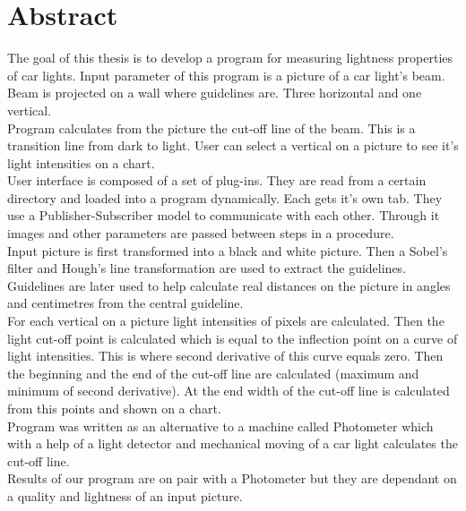 \documentclass[oneside, a4paper, 12pt]{book}
\newcommand{\clearemptydoublepage}{\newpage{\pagestyle{empty}\cleardoublepage}}
\begin{document}
\chapter*{Abstract}

The goal of this thesis is to develop a program for measuring lightness properties of car lights. Input parameter of this program is a picture of a car light's beam. Beam is projected on a wall where guidelines are. Three horizontal and one vertical. \\
Program calculates from the picture the cut-off line of the beam. This is a transition line from dark to light. User can select a vertical on a picture to see it's light intensities on a chart.\\
User interface is composed of a set of plug-ins. They are read from a certain directory and loaded into a program dynamically. Each gets it's own tab. They use a Publisher-Subscriber model to communicate with each other. Through it images and other parameters are passed between steps in a procedure.\\
Input picture is first transformed into a black and white picture. Then a Sobel's filter and Hough's line transformation are used to extract the guidelines. Guidelines are later used to help calculate real distances on the picture in angles and centimetres from the central guideline. \\
For each vertical on a picture light intensities of pixels are calculated. Then the light cut-off point is calculated which is equal to the inflection point on a curve of light intensities. This is where second derivative of this curve equals zero. Then the beginning and the end of the cut-off line are calculated (maximum and minimum of second derivative). At the end width of the cut-off line is calculated from this points and shown on a chart.\\
Program was written as an alternative to a machine called Photometer which with a help of a light detector and mechanical moving of a car light calculates the cut-off line.\\
Results of our program are on pair with a Photometer but they are dependant on a quality and lightness of an input picture.


\clearemptydoublepage

\mainmatter
\setcounter{page}{1}
\pagestyle{fancy}
\end{document}
